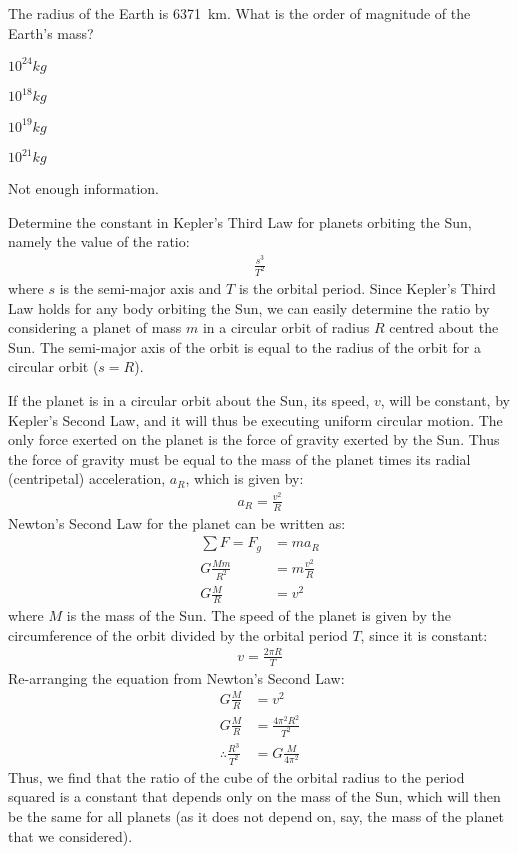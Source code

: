 \begin{checkpoint}
\begin{MCquestion}{The radius of the Earth is \SI{6371}{km}. What is the order of magnitude of the Earth's mass?}
\item $10^{24}\si{kg}$\correct
\item $10^{18}\si{kg}$
\item $10^{19}\si{kg}$
\item $10^{21}\si{kg}$
\item Not enough information.
\end{MCquestion}
\end{checkpoint}
\newpage
\begin{example}{\label{ex:gravity:keplerconstant}Determine the constant in Kepler's Third Law for planets orbiting the Sun, namely the value of the ratio:
\begin{align*}
\frac{s^3}{T^2}
\end{align*}
where $s$ is the semi-major axis and $T$ is the orbital period.
}
Since Kepler's Third Law holds for any body orbiting the Sun, we can easily determine the ratio by considering a planet of mass $m$ in a circular orbit of radius $R$ centred about the Sun. The semi-major axis of the orbit is equal to the radius of the orbit for a circular orbit ($s=R$).

If the planet is in a circular orbit about the Sun, its speed, $v$, will be constant, by Kepler's Second Law, and it will thus be executing uniform circular motion. The only force exerted on the planet is the force of gravity exerted by the Sun. Thus the force of gravity must be equal to the mass of the planet times its radial (centripetal) acceleration, $a_R$, which is given by:
\begin{align*}
a_R=\frac{v^2}{R}
\end{align*}
Newton's Second Law for the planet can be written as:
\begin{align*}
\sum F = F_g &= ma_R\\
G\frac{Mm}{R^2}&=m\frac{v^2}{R}\\
G\frac{M}{R}&=v^2
\end{align*}
where $M$ is the mass of the Sun. The speed of the planet is given by the circumference of the orbit divided by the orbital period $T$, since it is constant:
\begin{align*}
v=\frac{2\pi R}{T}
\end{align*}
Re-arranging the equation from Newton's Second Law:
\begin{align*}
G\frac{M}{R}&=v^2\\
G\frac{M}{R}&=\frac{4\pi^2 R^2}{T^2}\\
\therefore \frac{R^3}{T^2}&=G\frac{M}{4\pi^2}
\end{align*}
Thus, we find that the ratio of the cube of the orbital radius to the period squared is a constant that depends only on the mass of the Sun, which will then be the same for all planets (as it does not depend on, say, the mass of the planet that we considered).


\end{example}
